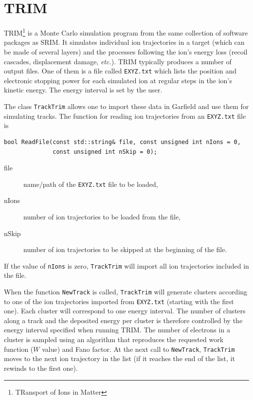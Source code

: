 \section{TRIM}
TRIM\footnote{TRansport of Ions in Matter} is a Monte Carlo simulation program 
from the same collection of software packages as SRIM. 
It simulates individual ion trajectories in a target 
(which can be made of several layers) and the processes following the ion's energy loss 
(recoil cascades, displacement damage, \textit{etc.}). 
TRIM typically produces a number of output files. 
One of them is a file called \texttt{EXYZ.txt} which lists the 
position and electronic stopping power for each simulated ion at 
regular steps in the ion's kinetic energy.
The energy interval is set by the user.

The class \texttt{TrackTrim} allows one to import these data in Garfield 
and use them for simulating tracks. The function for 
reading ion trajectories from an \texttt{EXYZ.txt} file is 
\begin{lstlisting}
bool ReadFile(const std::string& file, const unsigned int nIons = 0,
              const unsigned int nSkip = 0);
\end{lstlisting}
\begin{description}
  \item[file] name/path of the \texttt{EXYZ.txt} file to be loaded,
  \item[nIons] number of ion trajectories to be loaded from the file,
  \item[nSkip] number of ion trajectories to be skipped at the beginning of the file.
\end{description}
If the value of \texttt{nIons} is zero, \texttt{TrackTrim} will 
import all ion trajectories included in the file.

When the function \texttt{NewTrack} is called, 
\texttt{TrackTrim} will generate clusters according to one of the ion 
trajectories imported from \texttt{EXYZ.txt} (starting with the first one). 
Each cluster will correspond to one energy interval. 
The number of clusters along a track and the deposited energy per cluster 
is therefore controlled by the energy interval specified when running TRIM.
The number of electrons in a cluster is sampled using an algorithm 
that reproduces the requested work function ($W$ value) and Fano factor.
At the next call to \texttt{NewTrack}, \texttt{TrackTrim} moves to the  
next ion trajectory in the list (if it reaches the end of the list, 
it rewinds to the first one). 


